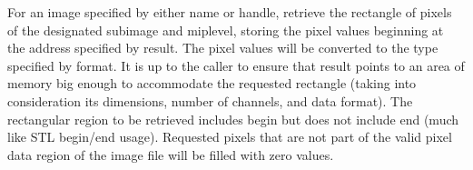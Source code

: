 For an image specified by either name or handle,
retrieve the rectangle of pixels
of the designated {\cf subimage} and {\cf miplevel}, storing the pixel values
beginning at the address specified by result.  The pixel values will be
converted to the type specified by {\cf format}.  It is up to the caller
to ensure that result points to an area of memory big enough to
accommodate the requested rectangle (taking into consideration its
dimensions, number of channels, and data format).
The rectangular region to be retrieved includes {\cf begin} but does not
include {\cf end} (much like STL begin/end usage).
Requested pixels that are not part of the valid pixel data region of the
image file will be filled with zero values.
\apiend

